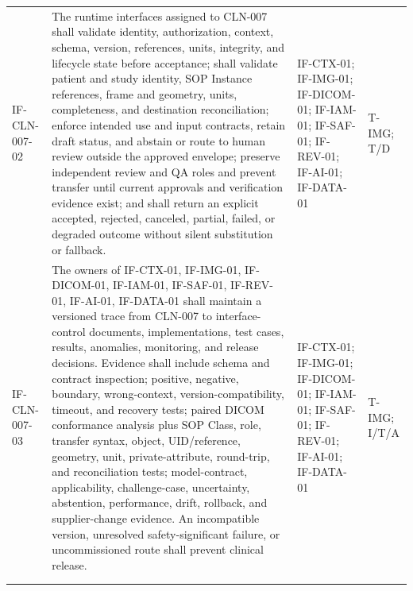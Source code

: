 \documentclass[11pt,letterpaper]{article}
\begin{document}
\begin{scriptsize}
\begin{longtable}{@{}L{0.14\textwidth}L{0.49\textwidth}L{0.19\textwidth}L{0.10\textwidth}@{}}
\addlinespace[2pt]
\mbox{IF-CLN-007-02} & The runtime interfaces assigned to CLN-007 shall validate identity, authorization, context, schema, version, references, units, integrity, and lifecycle state before acceptance; shall validate patient and study identity, SOP Instance references, frame and geometry, units, completeness, and destination reconciliation; enforce intended use and input contracts, retain draft status, and abstain or route to human review outside the approved envelope; preserve independent review and QA roles and prevent transfer until current approvals and verification evidence exist; and shall return an explicit accepted, rejected, canceled, partial, failed, or degraded outcome without silent substitution or fallback. & IF-CTX-01; IF-IMG-01; IF-DICOM-01; IF-IAM-01; IF-SAF-01; IF-REV-01; IF-AI-01; IF-DATA-01 & T-IMG; T\slash\allowbreak{}D \\
\addlinespace[2pt]
\mbox{IF-CLN-007-03} & The owners of IF-CTX-01, IF-IMG-01, IF-DICOM-01, IF-IAM-01, IF-SAF-01, IF-REV-01, IF-AI-01, IF-DATA-01 shall maintain a versioned trace from CLN-007 to interface-control documents, implementations, test cases, results, anomalies, monitoring, and release decisions. Evidence shall include schema and contract inspection; positive, negative, boundary, wrong-context, version-compatibility, timeout, and recovery tests; paired DICOM conformance analysis plus SOP Class, role, transfer syntax, object, UID\slash\allowbreak{}reference, geometry, unit, private-attribute, round-trip, and reconciliation tests; model-contract, applicability, challenge-case, uncertainty, abstention, performance, drift, rollback, and supplier-change evidence. An incompatible version, unresolved safety-significant failure, or uncommissioned route shall prevent clinical release. & IF-CTX-01; IF-IMG-01; IF-DICOM-01; IF-IAM-01; IF-SAF-01; IF-REV-01; IF-AI-01; IF-DATA-01 & T-IMG; I\slash\allowbreak{}T\slash\allowbreak{}A \\
\addlinespace[2pt]
 \\
\addlinespace[2pt]

\end{longtable}
\end{scriptsize}
\end{document}

